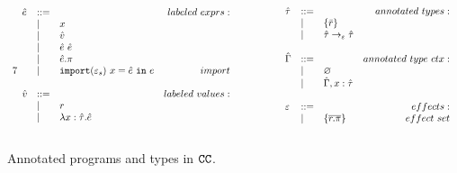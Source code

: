 \begin{figure}
\[
\begin{array}{lll}
7
\begin{array}{lllr}

\hat e & ::= & ~ & labeled~exprs: \\
	& | & x \\
	& | & \hat v \\
	& | & \hat e ~ \hat e \\
	& | & \hat e.\pi \\
	& | & \mathtt{import}(\varepsilon_s)~x = \hat e~\mathtt{in}~e & import \\
	&&\\

\hat v & ::= & ~ & labeled~values: \\
	& | & r \\
	& | & \lambda x: \hat \tau.\hat e \\
	&&\\

\end{array}

& ~~~~~~~~&

\begin{array}{lllr}

\hat \tau & ::= & ~ & annotated ~types: \\
		& | & \{ \bar r \} \\
		& | & \hat \tau \rightarrow_{\varepsilon} \hat \tau \\
		&&\\

\hat \Gamma & ::= & ~ & annotated~type~ctx:\\
				& | & \varnothing \\
				& | & \hat \Gamma, x: \hat \tau \\
				&&\\

\varepsilon & ::= & ~ & effects: \\
		& | & \{ \overline{r.\pi} \} & effect~set \\
		&&\\

\end{array}

\end{array}
\]
\vspace{-0.5cm}
\caption{Annotated programs and types in $\mathtt{CC}$.}
\vspace{-0.5cm}
\label{fig:epscalc_annotated_grammar}
\end{figure}

